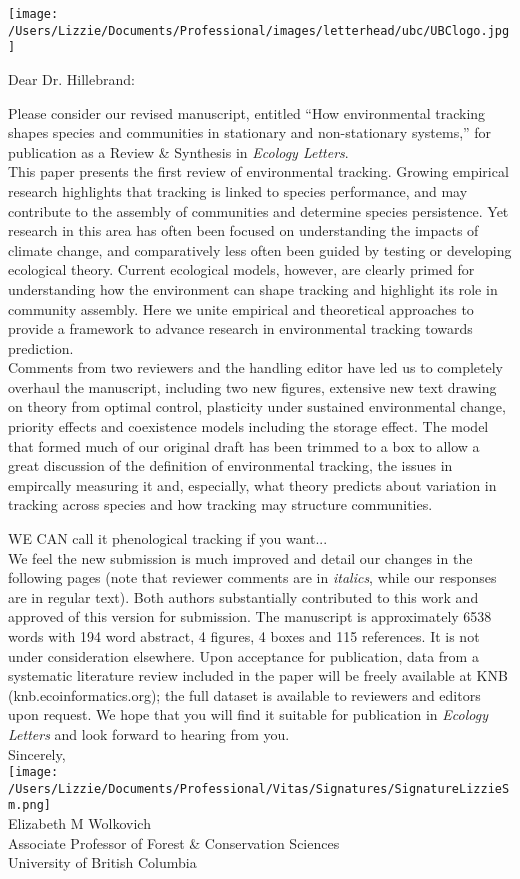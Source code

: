 \documentclass[11pt,a4paper]{letter}
\begin{document}
\begin{letter}{}
\texttt{[image: /Users/Lizzie/Documents/Professional/images/letterhead/ubc/UBClogo.jpg]}
\opening{Dear Dr. Hillebrand:}
Please consider our revised manuscript, entitled ``How environmental tracking shapes species and communities in stationary and non-stationary systems,'' for publication as a Review \& Synthesis in \emph{Ecology Letters}. 
\vspace{1.5ex}\\
This paper presents the first review of environmental tracking. Growing empirical research highlights that tracking is linked to species performance, and may contribute to the assembly of communities and determine species persistence. Yet research in this area has often been focused on understanding the impacts of climate change, and comparatively less often been guided by testing or developing ecological theory. Current ecological models, however, are clearly primed for understanding how the environment can shape tracking and highlight its role in community assembly. Here we unite empirical and theoretical approaches to provide a framework to advance research in environmental tracking towards prediction. 
\vspace{1.5ex}\\
Comments from two reviewers and the handling editor have led us to completely overhaul the manuscript, including two new figures, extensive new text drawing on theory from optimal control, plasticity under sustained environmental change, priority effects and coexistence models including the storage effect. The model that formed much of our original draft has been trimmed to a box to allow a great discussion of the definition of environmental tracking, the issues in empircally measuring it and, especially, what theory predicts about variation in tracking across species and how tracking may structure communities. 

WE CAN call it phenological tracking if you want... 
\vspace{1.5ex}\\
We feel the new submission is much improved and detail our changes in the following pages (note that reviewer comments are in \emph{italics}, while our responses are in regular text). Both authors substantially contributed to this work and approved of this version for submission. The manuscript is approximately 6538 words with 194 word abstract, 4 figures,  4 boxes and 115 references. It is not under consideration elsewhere. Upon acceptance for publication, data from a systematic literature review included in the paper will be freely available at KNB (knb.ecoinformatics.org); the full dataset is available to reviewers and editors upon request. We hope that you will find it suitable for publication in \emph{Ecology Letters} and look forward to hearing from you.
\vspace{1.5ex}\\
Sincerely,\\

\texttt{[image: /Users/Lizzie/Documents/Professional/Vitas/Signatures/SignatureLizzieSm.png]} \\

Elizabeth M Wolkovich\\
Associate Professor of Forest \& Conservation Sciences\\ 
University of British Columbia
\end{letter}
\end{document}
